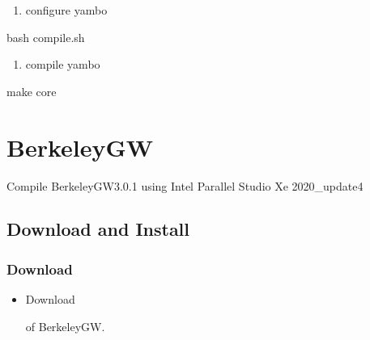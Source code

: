 \documentclass[a4paper,12pt,english]{sphinxmanual}
\begin{document}
\begin{enumerate}
%
\setcounter{enumi}{1}
\item {} 
\sphinxAtStartPar
configure yambo

\end{enumerate}

\begin{sphinxVerbatim}[commandchars=\\\{\}]
bash compile.sh
\end{sphinxVerbatim}
\begin{enumerate}
%
\setcounter{enumi}{2}
\item {} 
\sphinxAtStartPar
compile yambo

\end{enumerate}

\begin{sphinxVerbatim}[commandchars=\\\{\}]
make core
\end{sphinxVerbatim}


\section{BerkeleyGW}
\label{\detokenize{compile:berkeleygw}}
\sphinxAtStartPar
Compile BerkeleyGW\sphinxhyphen{}3.0.1 using Intel Parallel Studio Xe 2020\_update4


\subsection{Download and Install}
\label{\detokenize{compile/BerkeleyGW_3.0.1:download-and-install}}\label{\detokenize{compile/BerkeleyGW_3.0.1::doc}}

\subsubsection{Download}
\label{\detokenize{compile/BerkeleyGW_3.0.1:download}}\begin{itemize}
\item {} 
\sphinxAtStartPar
Download %
\begin{footnote}[23]\sphinxAtStartFootnote
{}
%
\end{footnote} of BerkeleyGW.

\end{itemize}
\end{document}
